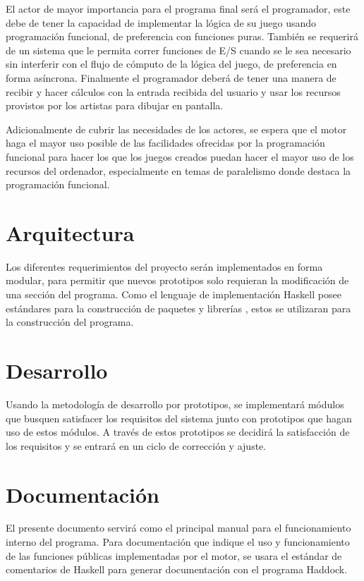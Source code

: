 El actor de mayor importancia para el programa final será el programador, este debe de tener la capacidad de implementar la lógica de su juego usando programación funcional, de preferencia con funciones puras. También se requerirá de un sistema que le permita correr funciones de E/S cuando se le sea necesario sin interferir con el flujo de cómputo de la lógica del juego, de preferencia en forma asíncrona. Finalmente el programador deberá de tener una manera de recibir y hacer cálculos con la entrada recibida del usuario y usar los recursos provistos por los artistas para dibujar en pantalla.

Adicionalmente de cubrir las necesidades de los actores, se espera que el motor haga el mayor uso posible de las facilidades ofrecidas por la programación funcional para hacer los que los juegos creados puedan hacer el mayor uso de los recursos del ordenador, especialmente en temas de paralelismo donde destaca la programación funcional.

\section{Arquitectura}

Los diferentes requerimientos del proyecto serán implementados en forma modular, para permitir que nuevos prototipos solo requieran la modificación de una sección del programa. Como el lenguaje de implementación Haskell posee estándares para la construcción de paquetes y librerías \cite{wiki:WriteAHaskellProgram}, estos se utilizaran para la construcción del programa.

\section{Desarrollo}

Usando la metodología de desarrollo por prototipos, se implementará módulos que busquen satisfacer los requisitos del sistema junto con prototipos que hagan uso de estos módulos. A través de estos prototipos se decidirá la satisfacción de los requisitos y se entrará en un ciclo de corrección y ajuste.

\section{Documentación}

El presente documento servirá como el principal manual para el funcionamiento interno del programa. Para documentación que indique el uso y funcionamiento de las funciones públicas implementadas por el motor, se usara el estándar de comentarios de Haskell para generar documentación con el programa Haddock.
